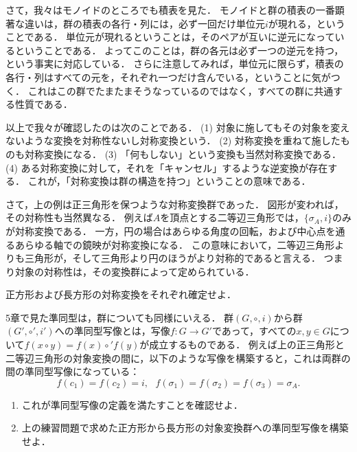 \documentclass[11pt,a4paper]{jsarticle}
\begin{document}
さて，我々はモノイドのところでも積表を見た．
モノイドと群の積表の一番顕著な違いは，群の積表の各行・列には，必ず一回だけ単位元$i$が現れる，ということである．
単位元が現れるということは，そのペアが互いに逆元になっているということである．
よってこのことは，群の各元は必ず一つの逆元を持つ，という事実に対応している．
さらに注意してみれば，単位元に限らず，積表の各行・列はすべての元を，それぞれ一つだけ含んでいる，ということに気がつく．
これはこの群でたまたまそうなっているのではなく，すべての群に共通する性質である．

以上で我々が確認したのは次のことである．
(1) 対象に施してもその対象を変えないような変換を対称性ないし対称変換という．
(2) 対称変換を重ねて施したものも対称変換になる．
(3) 「何もしない」という変換も当然対称変換である．
(4) ある対称変換に対して，それを「キャンセル」するような逆変換が存在する．
これが，「対称変換は群の構造を持つ」ということの意味である．

さて，上の例は正三角形を保つような対称変換群であった．
図形が変われば，その対称性も当然異なる．
例えば$A$を頂点とする二等辺三角形では，$\{ \sigma_A, i\}$のみが対称変換である．
一方，円の場合はあらゆる角度の回転，および中心点を通るあらゆる軸での鏡映が対称変換になる．
この意味において，二等辺三角形よりも三角形が，そして三角形より円のほうがより対称的であると言える．
つまり対象の対称性は，その変換群によって定められている．

\begin{exercise}
    正方形および長方形の対称変換をそれぞれ確定せよ．
\end{exercise}

\begin{exercise}
    5章で見た準同型は，群についても同様にいえる．
    群$(G, \circ, i)$から群$(G', \circ', i')$への準同型写像とは，写像$f:G \to G'$であって，すべての$x, y \in G$について$f(x\circ y) = f(x) \circ' f(y)$が成立するものである．
    例えば上の正三角形と二等辺三角形の対象変換の間に，以下のような写像を構築すると，これは両群の間の準同型写像になっている：
    \[
    f(c_1)=f(c_2)=i, \ \ \ f(\sigma_1) = f(\sigma_2) = f(\sigma_3) = \sigma_A.    
    \]
    \begin{enumerate}
        \item これが準同型写像の定義を満たすことを確認せよ．
        \item 上の練習問題で求めた正方形から長方形の対象変換群への準同型写像を構築せよ．
    \end{enumerate}
\end{exercise}
\end{document}

